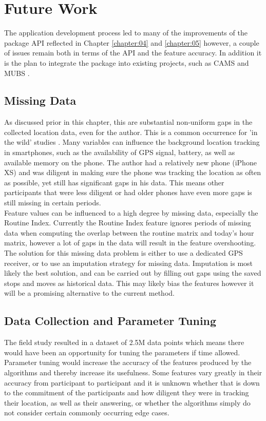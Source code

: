 \clearpage
\section{Future Work}
The application development process led to many of the improvements of the package API reflected in Chapter \ref{chapter:04} and \ref{chapter:05} however, a couple of issues remain both in terms of the API and the feature accuracy. In addition it is the plan to integrate the package into existing projects, such as CAMS \cite{CAMS} and MUBS \cite{mubs-rohani}.

\subsection{Missing Data}
As discussed prior in this chapter, this are substantial non-uniform gaps in the collected location data, even for the author. This is a common occurrence for 'in the wild' studies \cite{palmius2017}. Many variables can influence the background location tracking in smartphones, such as the availability of GPS signal, battery, as well as available memory on the phone. The author had a relatively new phone (iPhone XS) and was diligent in making sure the phone was tracking the location as often as possible, yet still has significant gaps in his data. This means other participants that were less diligent or had older phones have even more gaps is still missing in certain periods. \\

Feature values can be influenced to a high degree by missing data, especially the Routine Index. Currently the Routine Index feature ignores periods of missing data when computing the overlap between the routine matrix and today's hour matrix, however a lot of gaps in the data will result in the feature overshooting. The solution for this missing data problem is either to use a dedicated GPS receiver, or to use an imputation strategy for missing data. Imputation is most likely the best solution, and can be carried out by filling out gaps using the saved stops and moves as historical data. This may likely bias the features however it will be a promising alternative to the current method.

\subsection{Data Collection and Parameter Tuning}
The field study resulted in a dataset of 2.5M data points which means there would have been an opportunity for tuning the parameters if time allowed. Parameter tuning would increase the accuracy of the features produced by the algorithms and thereby increase its usefulness. Some features vary greatly in their accuracy from participant to participant and it is unknown whether that is down to the commitment of the participants and how diligent they were in tracking their location, as well as their answering, or whether the algorithms simply do not consider certain commonly occurring edge cases.\\

